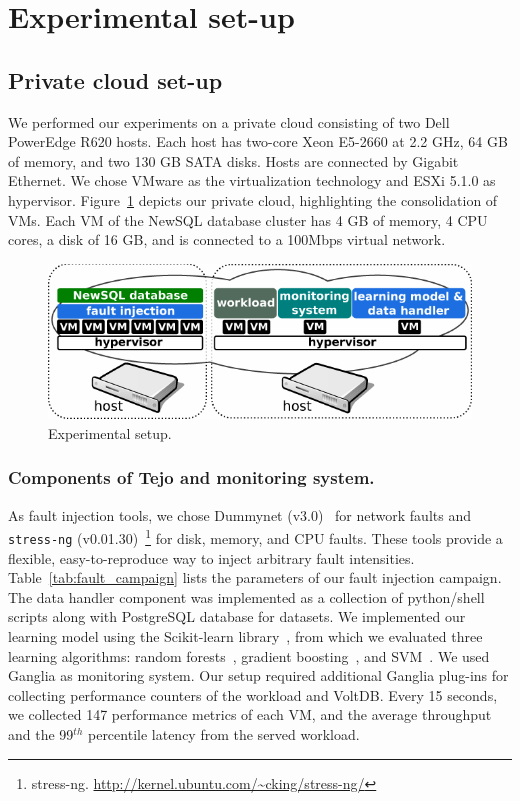 \section{Experimental set-up}
\label{sec:experiment}



\subsection{Private cloud set-up}

We performed our experiments on a private cloud consisting of two Dell PowerEdge R620 hosts. Each host has two-core Xeon E5-2660 at 2.2 GHz, 64 GB of memory, and two 130 GB SATA disks. Hosts are connected by Gigabit Ethernet. We chose VMware as the virtualization technology and ESXi 5.1.0 as hypervisor. Figure~\ref{fig:experimental_scenario_extended} depicts our private cloud, highlighting the consolidation of VMs. Each VM of the NewSQL database cluster has 4 GB of memory, 4 CPU cores, a disk of 16 GB, and is connected to a 100Mbps virtual network.

\begin{figure}[!h]
  \centering
     \includegraphics[width=1\textwidth]{inputs/img/experimental_scenario_extended_2}
  \caption{Experimental setup.}
  \label{fig:experimental_scenario_extended}
\end{figure}

\subsubsection{Components of Tejo and monitoring system.} As fault injection tools, we chose Dummynet (v3.0)~\cite{carbone2010dummynet} for network faults and \verb|stress-ng| (v0.01.30)~\footnote{stress-ng. \url{http://kernel.ubuntu.com/~cking/stress-ng/}} for disk, memory, and CPU faults. These tools provide a flexible, easy-to-reproduce way to inject arbitrary fault intensities. Table~\ref{tab:fault_campaign} lists the parameters of our fault injection campaign. The data handler component was implemented as a collection of python/shell scripts along with PostgreSQL database for datasets. We implemented our learning model using the Scikit-learn library~\cite{scikitlearn11}, from which we evaluated three learning algorithms: random forests~\cite{breiman2001random}, gradient boosting~\cite{friedman2006recent}, and SVM~\cite{svm_1995}. We used Ganglia as monitoring system. Our setup required additional Ganglia plug-ins for collecting performance counters of the workload and VoltDB. Every 15 seconds, we collected 147 performance metrics of each VM, and the average throughput and the 99$^{th}$ percentile latency from the served workload. 

